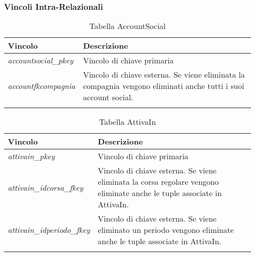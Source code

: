 \subsubsection{Vincoli Intra-Relazionali}

\begin{longtable}{|| m{} | m{} ||}
    \hline\hline
     \textbf{Vincolo} & \textbf{Descrizione} \\ [1ex]
     \hline\hline
     \endfirsthead

      \textit{accountsocial\_pkey} & Vincolo di chiave primaria  \\ [1ex]
      \hline

      \textit{accountfkcompagnia} & Vincolo di chiave esterna. Se viene eliminata la compagnia vengono eliminati anche tutti i suoi account social. \\ [1ex]
     \hline\hline

     \caption*{Tabella AccountSocial} \\
\end{longtable}

\begin{longtable}{|| m{} | m{} ||}
    \hline\hline
     \textbf{Vincolo} & \textbf{Descrizione} \\ [1ex]
     \hline\hline
     \endfirsthead

      \textit{attivain\_pkey} & Vincolo di chiave primaria  \\ [1ex]
      \hline

      \textit{attivain\_idcorsa\_fkey} & Vincolo di chiave esterna. Se viene eliminata la corsa regolare vengono eliminate anche le tuple associate in AttivaIn. \\ [1ex]
     \hline

     \textit{attivain\_idperiodo\_fkey} & Vincolo di chiave esterna. Se viene eliminato un periodo vengono eliminate anche le tuple associate in AttivaIn. \\ [1ex]
     \hline\hline

     \caption*{Tabella AttivaIn} \\
\end{longtable}

